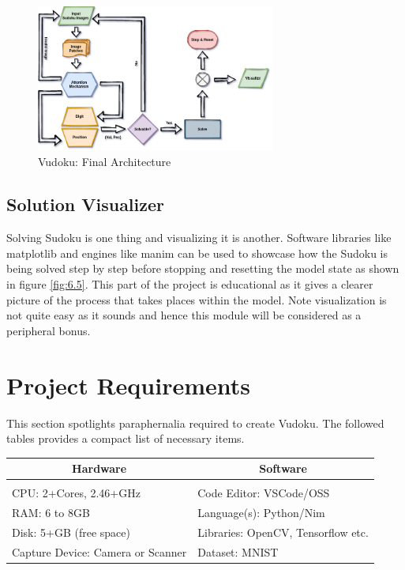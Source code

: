 \documentclass[12pt, a4paper]{report}
\begin{document}
\begin{figure}[!htbp]
    \centering
    \includegraphics[width=0.7\textwidth]{vudoku_arch03.png}
    \caption[Vudoku: Final Architecture]{Vudoku: Final Architecture}
    \label{fig:6.5}
\end{figure}

\subsection{Solution Visualizer}
\label{subsec:vizsol}

\hspace{0.5cm} Solving Sudoku is one thing and visualizing it is another. Software libraries like matplotlib \cite{art:hunter:2007} and engines like manim \cite{gh:3b1b:manim} can be used to showcase how the Sudoku is being solved step by step before stopping and resetting the model state as shown in figure \eqref{fig:6.5}. This part of the project is educational as it gives a clearer picture of the process that takes places within the model. Note visualization is not quite easy as it sounds and hence this module will be considered as a peripheral bonus.

\section{Project Requirements}

\hspace{0.5cm} This section spotlights paraphernalia required to create Vudoku. The followed tables provides a compact list of necessary items.

\begin{center}
    \begin{tabular}{l l}
        \multicolumn{1}{c}{\textbf{Hardware}} & \multicolumn{1}{c}{\textbf{Software}} \\[1em]
        \hline                                                                        \\
        CPU: 2+Cores, 2.46+GHz                & Code Editor: VSCode/OSS               \\
        RAM: 6 to 8GB                         & Language(s): Python/Nim               \\
        Disk: 5+GB (free space)               & Libraries: OpenCV, Tensorflow etc.    \\
        Capture Device: Camera or Scanner     & Dataset: MNIST
    \end{tabular}
\end{center}
\end{document}
